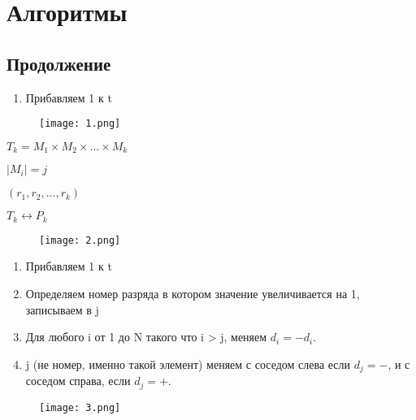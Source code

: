 


\chapter{Алгоритмы}


\section{Продолжение}


\begin{enumerate}
    \item Прибавляем 1 к t
\end{enumerate}

\begin{figure}[H]
    \centering
    \texttt{[image: 1.png]}
    
    
    \label{fig:1}
\end{figure}

$T_k = M_1 \times M_2 \times \dots \times M_k$

$|M_i| = j$

$(r_1, r_2, \dots, r_k)$

$T_k \leftrightarrow P_k$

\begin{figure}[H]
    \centering
    \texttt{[image: 2.png]}
    
    
    \label{fig:2}
\end{figure}

\begin{enumerate}
    \item Прибавляем 1 к t
    \item Определяем номер разряда в котором значение увеличивается на 1, записываем в j
    \item Для любого i от 1 до N такого что i > j, меняем $d_i = -d_i$.
    \item j (не номер, именно такой элемент) меняем с соседом слева если $d_j=-$, и с соседом справа, если $d_j = +$.
\end{enumerate}

\begin{figure}[H]
    \centering
    \texttt{[image: 3.png]}
    
    
    \label{fig:3}
\end{figure}

